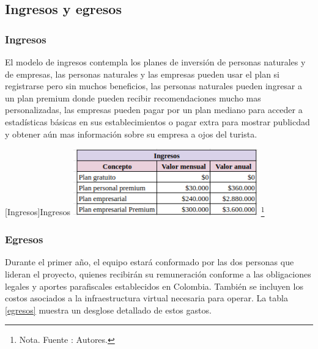 \subsection{Ingresos y egresos}

\subsubsection{Ingresos}

El modelo de ingresos contempla los planes de inversión de personas naturales y de empresas, las personas naturales y las empresas pueden usar el plan si registrarse pero sin muchos beneficios, las personas naturales pueden ingresar a un plan premium donde pueden recibir recomendaciones mucho mas personalizadas, las empresas pueden pagar por un plan mediano para acceder a estadísticas básicas en sus establecimientos o pagar extra para mostrar publicdad y obtener aún mas información sobre su empresa a ojos del turista.

  \vspace{2mm}
    \begin{minipage}{0.9\textwidth}
    \centering
    [{Ingresos}]{Ingresos}
    \label{Ingresos}
    \includegraphics[width=0.6\textwidth]{Content/Images/AF/ingresos.png}
    \footnote{Nota. \textup{Fuente : Autores.}}
    \end{minipage}


\subsubsection{Egresos}
Durante el primer año, el equipo estará conformado por las dos personas que lideran el proyecto, quienes recibirán su remuneración conforme a las obligaciones legales y aportes parafiscales establecidos en Colombia. También se incluyen los costos asociados a la infraestructura virtual necesaria para operar. La tabla \ref{egresos} muestra un desglose detallado de estos gastos.

